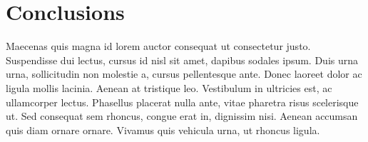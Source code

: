 \documentclass[a4paper]{report}
\begin{document}
\chapter{Conclusions}
Maecenas quis magna id lorem auctor consequat ut consectetur justo. Suspendisse dui lectus, cursus id nisl sit amet, dapibus sodales ipsum. Duis urna urna, sollicitudin non molestie a, cursus pellentesque ante. Donec laoreet dolor ac ligula mollis lacinia. Aenean at tristique leo. Vestibulum in ultricies est, ac ullamcorper lectus. Phasellus placerat nulla ante, vitae pharetra risus scelerisque ut. Sed consequat sem rhoncus, congue erat in, dignissim nisi. Aenean accumsan quis diam ornare ornare. Vivamus quis vehicula urna, ut rhoncus ligula. 




\end{document}
